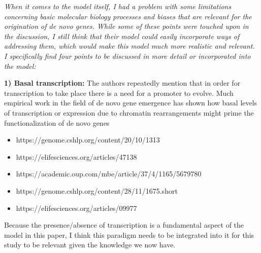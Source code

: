 \documentclass[12pt,a4paper]{article}
\begin{document}
{\itshape When it comes to the model itself, I had a problem with some limitations concerning basic molecular biology processes and biases that are relevant for the origination of de novo genes. While some of these points were touched upon in the discussion, I still think that their model could easily incorporate ways of addressing them, which would make this model much more realistic and relevant. I specifically find four points to be discussed in more detail or incorporated into the model:



\textbf{1) Basal transcription:} The authors repeatedly mention that in order for transcription to take place there is a need for a promoter to evolve. Much empirical work in the field of de novo gene emergence has shown how basal levels of transcription or expression due to chromatin rearrangements might prime the functionalization of de novo genes 

\begin{itemize}\setlength{\itemsep}{-5pt}
\item https://genome.cshlp.org/content/20/10/1313
\item https://elifesciences.org/articles/47138
\item https://academic.oup.com/mbe/article/37/4/1165/5679780
\item https://genome.cshlp.org/content/28/11/1675.short
\item https://elifesciences.org/articles/09977
\end{itemize}

Because the presence/absence of transcription is a fundamental aspect of the model in this paper, I think this paradigm needs to be integrated into it for this study to be relevant given the knowledge we now have.
}
\end{document}
